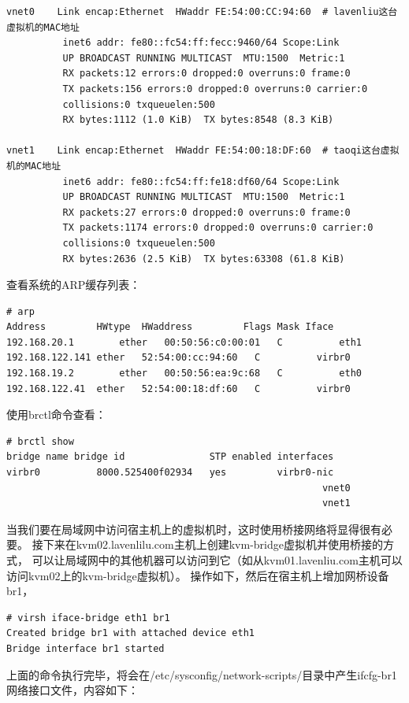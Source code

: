 \begin{verbatim}
vnet0    Link encap:Ethernet  HWaddr FE:54:00:CC:94:60  # lavenliu这台虚拟机的MAC地址
          inet6 addr: fe80::fc54:ff:fecc:9460/64 Scope:Link
          UP BROADCAST RUNNING MULTICAST  MTU:1500  Metric:1
          RX packets:12 errors:0 dropped:0 overruns:0 frame:0
          TX packets:156 errors:0 dropped:0 overruns:0 carrier:0
          collisions:0 txqueuelen:500 
          RX bytes:1112 (1.0 KiB)  TX bytes:8548 (8.3 KiB)

vnet1    Link encap:Ethernet  HWaddr FE:54:00:18:DF:60  # taoqi这台虚拟机的MAC地址
          inet6 addr: fe80::fc54:ff:fe18:df60/64 Scope:Link
          UP BROADCAST RUNNING MULTICAST  MTU:1500  Metric:1
          RX packets:27 errors:0 dropped:0 overruns:0 frame:0
          TX packets:1174 errors:0 dropped:0 overruns:0 carrier:0
          collisions:0 txqueuelen:500 
          RX bytes:2636 (2.5 KiB)  TX bytes:63308 (61.8 KiB)
\end{verbatim}

查看系统的ARP缓存列表：

\begin{verbatim}
# arp
Address         HWtype  HWaddress         Flags Mask Iface
192.168.20.1		ether   00:50:56:c0:00:01	C          eth1
192.168.122.141	ether   52:54:00:cc:94:60	C          virbr0
192.168.19.2		ether   00:50:56:ea:9c:68	C          eth0
192.168.122.41	ether   52:54:00:18:df:60	C          virbr0
\end{verbatim}

使用brctl命令查看：

\begin{verbatim}
# brctl show
bridge name	bridge id				STP enabled	interfaces
virbr0			8000.525400f02934	yes			virbr0-nic
														vnet0
														vnet1
\end{verbatim}

当我们要在局域网中访问宿主机上的虚拟机时，这时使用桥接网络将显得很有必要。
接下来在kvm02.lavenlilu.com主机上创建kvm-bridge虚拟机并使用桥接的方式，
可以让局域网中的其他机器可以访问到它（如从kvm01.lavenliu.com主机可以访问kvm02上的kvm-bridge虚拟机）。
操作如下，然后在宿主机上增加网桥设备br1，

\begin{verbatim}
# virsh iface-bridge eth1 br1
Created bridge br1 with attached device eth1
Bridge interface br1 started
\end{verbatim}

上面的命令执行完毕，将会在/etc/sysconfig/network-scripts/目录中产生ifcfg-br1网络接口文件，内容如下：

